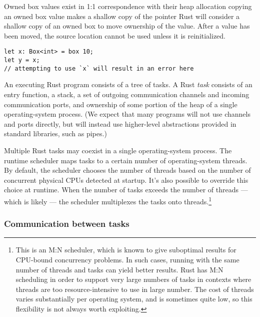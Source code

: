 \documentclass[]{article}
\begin{document}
Owned box values exist in 1:1 correspondence with their heap allocation
copying an owned box value makes a shallow copy of the pointer Rust will
consider a shallow copy of an owned box to move ownership of the value.
After a value has been moved, the source location cannot be used unless
it is reinitialized.

\begin{verbatim}
let x: Box<int> = box 10;
let y = x;
// attempting to use `x` will result in an error here
\end{verbatim}


An executing Rust program consists of a tree of tasks. A Rust
\emph{task} consists of an entry function, a stack, a set of outgoing
communication channels and incoming communication ports, and ownership
of some portion of the heap of a single operating-system process. (We
expect that many programs will not use channels and ports directly, but
will instead use higher-level abstractions provided in standard
libraries, such as pipes.)

Multiple Rust tasks may coexist in a single operating-system process.
The runtime scheduler maps tasks to a certain number of operating-system
threads. By default, the scheduler chooses the number of threads based
on the number of concurrent physical CPUs detected at startup. It's also
possible to override this choice at runtime. When the number of tasks
exceeds the number of threads --- which is likely --- the scheduler
multiplexes the tasks onto threads.\footnote{This is an M:N scheduler,
  which is known to give suboptimal results for CPU-bound concurrency
  problems. In such cases, running with the same number of threads and
  tasks can yield better results. Rust has M:N scheduling in order to
  support very large numbers of tasks in contexts where threads are too
  resource-intensive to use in large number. The cost of threads varies
  substantially per operating system, and is sometimes quite low, so
  this flexibility is not always worth exploiting.}

\subsubsection{Communication between
tasks}\label{communication-between-tasks}
\end{document}
